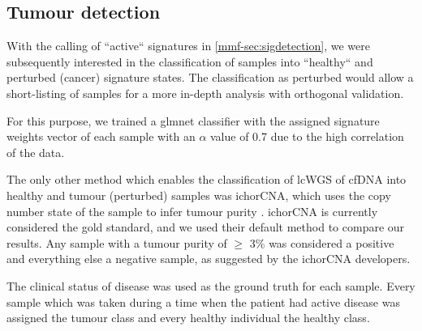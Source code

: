 \subsection{Tumour detection}
\label{mmf-sec:tumourdetection}

With the calling of ``active`` signatures in \autoref{mmf-sec:sigdetection}, we were subsequently interested in the classification of samples into ``healthy`` and perturbed (cancer) signature states. The classification as perturbed would allow a short-listing of samples for a more in-depth analysis with orthogonal validation.

For this purpose, we trained a glmnet classifier with the assigned signature weights vector of each sample with an $\alpha$ value of 0.7 due to the high correlation of the data.

The only other method which enables the classification of lcWGS of cfDNA into healthy and tumour (perturbed) samples was ichorCNA, which uses the copy number state of the sample to infer tumour purity  \cite{Adalsteinsson2017}. ichorCNA is currently considered the gold standard, and we used their default method to compare our results. Any sample with a tumour purity of $\geq$ 3\% was considered a positive and everything else a negative sample, as suggested by the ichorCNA developers.

The clinical status of disease was used as the ground truth for each sample. Every sample which was taken during a time when the patient had active disease was assigned the tumour class and every healthy individual the healthy class.
